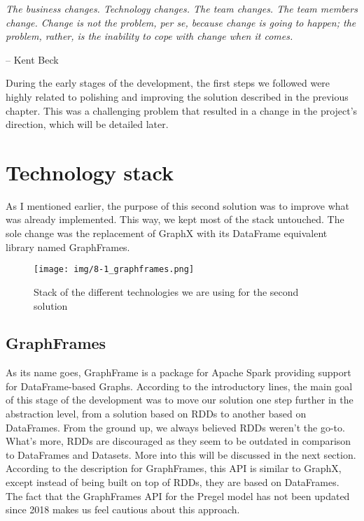 \epigraph{\textit{The business changes. Technology changes. The team changes. The team members change. Change is not the problem, per se, because change is going to happen; the problem, rather, is the inability to cope with change when it comes.}}{-- \textup{Kent Beck}}

During the early stages of the development, the first steps we followed were highly related to polishing and improving the solution described in the previous chapter. This was a challenging problem that resulted in a change in the project's direction, which will be detailed later.

\section{Technology stack}

As I mentioned earlier, the purpose of this second solution was to improve what was already implemented. This way, we kept most of the stack untouched. The sole change was the replacement of GraphX with its DataFrame equivalent library named GraphFrames.

\begin{figure}[ht]
    \centering
    \texttt{[image: img/8-1\_graphframes.png]}
    \caption[Stack of the different technologies we are using for the second solution]{Stack of the different technologies we are using for the second solution\footnotemark}
\end{figure}


\subsection{GraphFrames}

As its name goes, GraphFrame is a package for Apache Spark providing support for DataFrame-based Graphs. According to the introductory lines, the main goal of this stage of the development was to move our solution one step further in the abstraction level, from a solution based on RDDs to another based on DataFrames. From the ground up, we always believed RDDs weren't the go-to. What's more, RDDs are discouraged as they seem to be outdated in comparison to DataFrames and Datasets. More into this will be discussed in the next section. According to the description for GraphFrames, this API is similar to GraphX, except instead of being built on top of RDDs, they are based on DataFrames. The fact that the GraphFrames API for the Pregel model has not been updated since 2018 makes us feel cautious about this approach.

